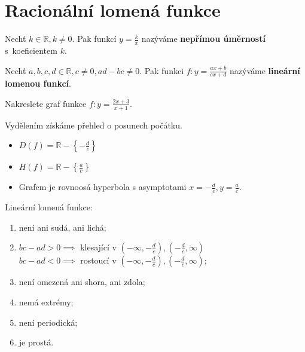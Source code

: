\section{Racionální lomená funkce}
\begin{definition}
    Nechť $k \in \mathbb R, k \ne 0.$ Pak funkcí $y=\frac{k}{x}$
    nazýváme \textbf{nepřímou úměrností} s~koeficientem $k$.
\end{definition}

\begin{definition}
    Nechť $a,b,c,d \in \mathbb R, c \ne 0, ad-bc \ne 0.$ Pak funkci
    $f:y=\frac{ax+b}{cx+d}$ nazýváme \textbf{lineární lomenou
    funkcí}.
\end{definition}

\begin{priklad}
Nakreslete graf funkce $f: y=\frac{2x+3}{x+1}.$
\end{priklad}

\begin{reseni}
Vydělením získáme přehled o posunech počátku.
\end{reseni}

\begin{pozn}
    \begin{itemize}
        \item $D(f)=\mathbb R - \left \{ -\frac{d}{c} \right \}$
       	\item $H(f)=\mathbb R - \left \{ \frac{a}{c} \right \}$
       	\item Grafem je rovnoosá hyperbola s asymptotami
        $x=-\frac{d}{c}, y=\frac{a}{c}.$
    \end{itemize}
\end{pozn}

\begin{veta}
    Lineární lomená funkce:
    \begin{enumerate}[$i.$]
        \item není ani sudá, ani lichá;
       	\item $bc-ad > 0 \implies$ klesající v
        $\left ( -\infty, -\frac{d}{c} \right ),
        \left ( -\frac{d}{c}, \infty \right ) $ \\
        $bc-ad < 0 \implies$ rostoucí v
        $\left ( -\infty, -\frac{d}{c} \right ),
        \left ( -\frac{d}{c}, \infty \right ) $;
       	\item není omezená ani shora, ani zdola;
       	\item nemá extrémy;
       	\item není periodická;
       	\item je prostá.
    \end{enumerate}
\end{veta}

